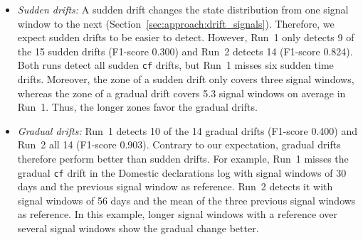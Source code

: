 \begin{itemize}
	\item \emph{Sudden drifts:} \label{sec:eval:padella:sudden} A sudden drift changes the state distribution from one signal window to the next (Section~\ref{sec:approach:drift_signals}). Therefore, we expect sudden drifts to be easier to detect. However, Run~1 only detects 9 of the 15 sudden drifts (F1-score 0.300) and Run~2 detects 14 (F1-score 0.824). Both runs detect all sudden \texttt{cf} drifts, but Run~1 misses six sudden time drifts. Moreover, the zone of a sudden drift only covers three signal windows, whereas the zone of a gradual drift covers 5.3 signal windows on average in Run~1. Thus, the longer zones favor the gradual drifts.
	\item \emph{Gradual drifts:} \label{sec:eval:padella:gradual} Run~1 detects 10 of the 14 gradual drifts (F1-score 0.400) and Run~2 all 14 (F1-score 0.903). Contrary to our expectation, gradual drifts therefore perform better than sudden drifts. For example, Run~1 misses the gradual \texttt{cf} drift in the Domestic declarations log with signal windows of 30 days and the previous signal window as reference. Run~2 detects it with signal windows of 56 days and the mean of the three previous signal windows as reference. In this example, longer signal windows with a reference over several signal windows show the gradual change better.
\end{itemize}

